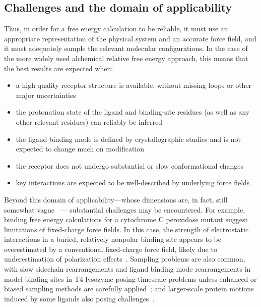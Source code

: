 \documentclass[aps,pre,twocolumn,nofootinbib,superscriptaddress,10pt, final,tightenlines]{revtex4-1}
\begin{document}
\subsection{Challenges and the domain of applicability}
Thus, in order for a free energy calculation to be reliable, it must use an appropriate representation of the physical system and an accurate force field, and it must adequately sample the relevant molecular configurations. 
In the case of the more widely used alchemical relative free energy approach, this means that the best results are expected when:\vspace{2mm}
\begin{itemize}
\item a high quality receptor structure is available, without missing loops or other major uncertainties
\item the protonation state of the ligand and binding-site residues (as well as any other relevant residues) can reliably be inferred
\item the ligand binding mode is defined by crystallographic studies and is not expected to change much on modification
\item the receptor does not undergo substantial or slow conformational changes
\item key interactions are expected to be well-described by underlying force fields 
\end{itemize}
\vspace{2mm}

Beyond this domain of applicability---whose dimensions are, in fact, still somewhat vague~\cite{Abel:2016:vertex} --- substantial challenges may be encountered. 
For example, binding free energy calculations for a cytochrome C peroxidase mutant suggest limitations of fixed-charge force fields. In this case, the strength of electrostatic interactions in a buried, relatively nonpolar binding site appears to be overestimated by a conventional fixed-charge force field, likely due to underestimation of polarization effects~\cite{rocklin_blind_2013}. 
Sampling problems are also common, with slow sidechain rearrangements and ligand binding mode rearrangements in model binding sites in T4 lysozyme posing timescale problems unless enhanced or biased sampling methods are carefully applied~\cite{mobley_confine_2007, boyce_predicting_2009, mobley_predicting_2007, jiang_free_2010, gallicchio_binding_2010, wang_achieving_2012}; and larger-scale protein motions induced by some ligands also posing challenges~\cite{boyce_predicting_2009, lim_sensitivity_2016}. 
\end{document}
